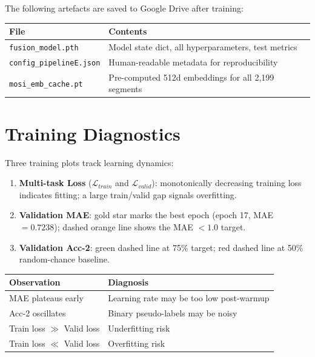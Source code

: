 \documentclass[12pt,a4paper]{article}
\theoremstyle{definition}
\begin{document}
The following artefacts are saved to Google Drive after training:

\begin{center}
\begin{tabular}{ll}
\toprule
\textbf{File} & \textbf{Contents} \\
\midrule
\texttt{fusion\_model.pth} & Model state dict, all hyperparameters, test metrics \\
\texttt{config\_pipelineE.json} & Human-readable metadata for reproducibility \\
\texttt{mosi\_emb\_cache.pt} & Pre-computed 512d embeddings for all 2,199 segments \\
\bottomrule
\end{tabular}
\end{center}

\section{Training Diagnostics}

Three training plots track learning dynamics:

\begin{enumerate}
  \item \textbf{Multi-task Loss} ($\mathcal{L}_{train}$ and $\mathcal{L}_{valid}$): monotonically decreasing training loss indicates fitting; a large train/valid gap signals overfitting.
  \item \textbf{Validation MAE}: gold star marks the best epoch (epoch 17, MAE $= 0.7238$); dashed orange line shows the MAE $<1.0$ target.
  \item \textbf{Validation Acc-2}: green dashed line at 75\% target; red dashed line at 50\% random-chance baseline.
\end{enumerate}

\begin{center}
\begin{tabular}{ll}
\toprule
\textbf{Observation} & \textbf{Diagnosis} \\
\midrule
MAE plateaus early & Learning rate may be too low post-warmup \\
Acc-2 oscillates & Binary pseudo-labels may be noisy \\
Train loss $\gg$ Valid loss & Underfitting risk \\
Train loss $\ll$ Valid loss & Overfitting risk \\
\bottomrule
\end{tabular}
\end{center}
\end{document}
